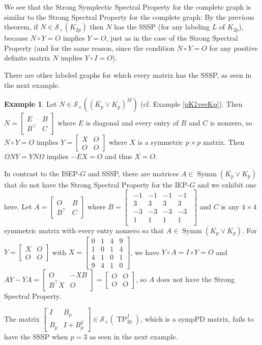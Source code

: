 \documentclass[12pt]{article}
\theoremstyle{definition}
\theoremstyle{definition}
\theoremstyle{definition}
\newtheorem{ex}[thm]{Example}
\numberwithin{figure}{section}
\numberwithin{equation}{section}
\newcommand{\symp}{\mathcal{S}_+}
\newcommand{\symm}{\operatorname{Symm}}
\newcommand{\tp}{\operatorname{TP}}
\newcommand{\trans}{^{\top}}
\newcommand{\mtx}[1]{\begin{bmatrix} #1 \end{bmatrix}}
\newcommand{\x}{\times}
\newcommand{\OL}{\overline}
\begin{document}
 We see that  the Strong Symplectic Spectral Property  for the complete graph  is similar to  the Strong Spectral Property for the complete graph: By the previous theorem, if $N\in\symp(K_{2p})$ then $N$ has the SSSP (for any labeling $L$ of $K_{2p}$), because $N\circ Y=O$ implies $Y=O$, just as in the case of the Strong Spectral Property  (and for the same reason{, since}   the condition $N\circ Y=O$ for any positive definite matrix $N$ implies $Y\circ I=O$). 


There are other labeled graphs for which every matrix has the SSSP, as seen in the next example.

\begin{ex}\label{ex:pK1veeKp-SSSP}
   Let  
$N\in\symp((\overline{K_{p}} \vee K_{p})^M)$ (cf. Example \ref{pK1veeKp}).  Then $N=\mtx{E & B\\B\trans & C}$ where $E$ is diagonal and every entry of $B$ and $C$ is nonzero, so $N\circ Y=O$ implies $Y=\mtx{X& O\\O& O}$ where $X$ is a symmetric $p\x p$ matrix.  Then $\Omega NY=YN\Omega$ implies $-EX=O$ and thus $X=O$. 

In contrast to the ISEP-$G$ and SSSP, there are matrices $A\in\symm(\OL{K_p}\vee K_p)$ that do not have the Strong Spectral Property for the IEP-$G$ and we exhibit one here. Let $A=\mtx{O & B\\B\trans & C}$ where $B=\mtx{
\begin{array}{rrrr}
-1 & -1 & -1 & -1\\3 & 3&3&3\\ -3 & -3&-3&-3\\1 & 1 & 1 & 1\end{array}}$ and $C$ is any $4\x 4$ symmetric matrix with every entry nonzero so that
$A\in\symm(\OL{K_p}\vee K_p)$.
For $Y=\mtx{X & O\\O & O}$  with $X=\mtx{0 &1& 4 & 9\\1 & 0 &1& 4\\4 & 1 & 0 & 1\\9 & 4&1&0}$, we have $Y\circ A=I\circ Y=O$ and $AY-YA=\mtx{O & -XB\\B\trans X & O}=\mtx{O & O\\O &  O}$, so $A$ does not have the Strong Spectral Property.
\end{ex}

 The matrix $\mtx{ I & B_p \\
      B_p & I + B_p^2 }\in \symp(\tp_{2p}^I)$, which is a sympPD matrix, fails to have the SSSP when $p=3$ as seen in the next example.
\end{document}
